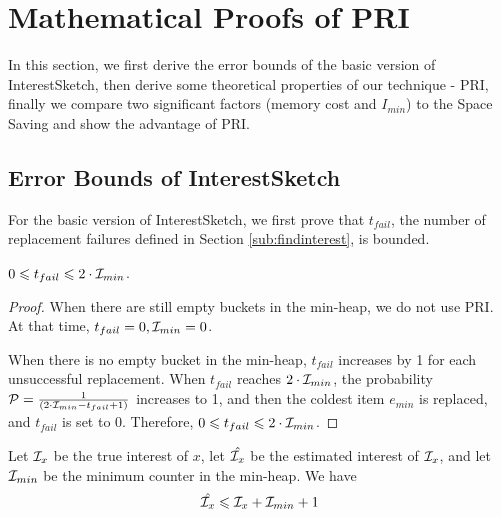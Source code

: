 \presub
\section{Mathematical Proofs of PRI}
\postsub

In this section, we first derive the error bounds of the basic version of InterestSketch, then derive some theoretical properties of our technique - PRI, {\color{reviewC}finally we compare two significant factors (memory cost and $I_{min}$) to the Space Saving and show the advantage of PRI.}

\presub
\subsection{Error Bounds of InterestSketch}
\postsub

For the basic version of InterestSketch, we first prove that $t_{fail}$, the number of replacement failures defined in Section \ref{sub:findinterest}, is bounded.

\begin{theorem}
	\label{theo:zero}
	$0 \leqslant t_{fail} \leqslant 2\cdot\mathcal{I}_{min}$.
\end{theorem}

\begin{proof}
When there are still empty buckets in the min-heap, we do not use PRI. At that time, $t_{fail} = 0, \mathcal{I}_{min} = 0$.

When there is no empty bucket in the min-heap, $t_{fail}$ increases by 1 for each unsuccessful replacement. When $t_{fail}$ reaches $2\cdot\mathcal{I}_{min}$, the probability $\mathcal{P} = \frac{1}{(2\cdot\mathcal{I}_{min}-t_{fail}+1)}$ increases to 1, and then the coldest item $e_{min}$ is replaced, and $t_{fail}$ is set to 0.
Therefore,
$0 \leqslant t_{fail} \leqslant 2\cdot\mathcal{I}_{min}$.

\end{proof}


\begin{theorem}
	\label{theo:first}
	Let $\mathcal{I}_x$ be the true interest of $x$, let $\hat{\mathcal{I}_x}$ be the estimated interest of $\mathcal{I}_x$, and let $\mathcal{I}_{min}$ be the minimum counter in the min-heap. We have
	\begin{equation}
	\begin{aligned}
    \centering
    \hat{\iii_x} \leqslant \iii_x + \iii_{min} + 1
	\end{aligned}
	\end{equation}
\end{theorem}

